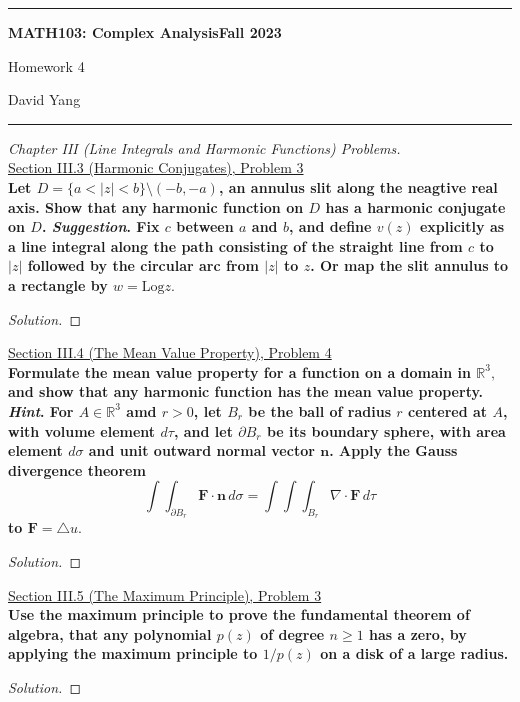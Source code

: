 \documentclass[11pt]{article}
\newenvironment{solution}
  {\renewcommand\qedsymbol{$\blacksquare$}\begin{proof}[Solution]}
  {\end{proof}}
\theoremstyle{definition}
\begin{document}
	\hrule
	\begin{center}
        \textbf{MATH103: Complex Analysis}\hfill \textbf{Fall 2023}\newline

		{\Large Homework 4}

		David Yang
	\end{center}

\hrule

\vspace{1em}


\textit{Chapter III (Line Integrals and Harmonic Functions) Problems.} \\

\underline{Section III.3 (Harmonic Conjugates), Problem 3} \\

\textbf{Let $D = \{a < |z| < b\} \setminus (-b, -a)$, an annulus slit along the neagtive real axis. Show that any harmonic function on $D$ has a harmonic conjugate on $D$. \textit{Suggestion}. Fix $c$ between $a$ and $b$, and define $v(z)$ explicitly as a 
line integral along the path consisting of the straight line from $c$ to $|z|$ followed by the circular arc from $|z|$ to $z$. Or map the slit annulus to a rectangle by $w = \mathrm{Log} z.$}

\begin{solution}
\end{solution}

\underline{Section III.4 (The Mean Value Property), Problem 4} \\

\textbf{Formulate the mean value property for a function on a domain in $\mathbb{R}^3,$ and show that any harmonic function has the mean value property. \textit{Hint}. For $A \in \mathbb{R}^3$ amd $r> 0$, let $B_r$ be the ball of radius $r$
centered at $A$, with volume element $d\tau$, and let $\partial B_r$ be its boundary sphere, with area element $d\sigma$ and unit outward normal vector $\textbf{n}$. 
Apply the Gauss divergence theorem \[ \int\int_{\partial B_r} \textbf{F} \cdot \textbf{n} \, d\sigma = \int\int\int_{B_r} \nabla \cdot \textbf{F} \, d\tau \] to $\textbf{F} = \triangle u.$}

\begin{solution}
    
\end{solution}

\underline{Section III.5 (The Maximum Principle), Problem 3} \\

\textbf{Use the maximum principle to prove the fundamental theorem of algebra, that any polynomial $p(z)$ of degree $n \geq 1$ has a zero, by applying the maximum principle
to $1/p(z)$ on a disk of a large radius.}

\begin{solution}
    
\end{solution}
\end{document}
